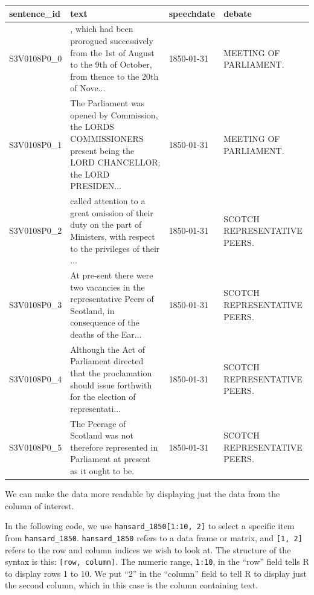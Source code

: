 \documentclass[
]{article}
\begin{document}
\begin{tabular}{l>{\raggedright\arraybackslash}p{4cm}ll}
\toprule
sentence\_id & text & speechdate & debate\\
\midrule
S3V0108P0\_0 & , which had been prorogued successively from the 1st of August to the 9th of October, from thence to the 20th of Nove... & 1850-01-31 & MEETING OF PARLIAMENT.\\
S3V0108P0\_1 & The Parliament was opened by Commission, the LORDS COMMISSIONERS present being the LORD CHANCELLOR; the LORD PRESIDEN... & 1850-01-31 & MEETING OF PARLIAMENT.\\
S3V0108P0\_2 & called attention to a great omission of their duty on the part of Ministers, with respect to the privileges of their ... & 1850-01-31 & SCOTCH REPRESENTATIVE PEERS.\\
S3V0108P0\_3 & At pre-sent there were two vacancies in the representative Peers of Scotland, in consequence of the deaths of the Ear... & 1850-01-31 & SCOTCH REPRESENTATIVE PEERS.\\
S3V0108P0\_4 & Although the Act of Parliament directed that the proclamation should issue forthwith for the election of representati... & 1850-01-31 & SCOTCH REPRESENTATIVE PEERS.\\
\addlinespace
S3V0108P0\_5 & The Peerage of Scotland was not therefore represented in Parliament at present as it ought to be. & 1850-01-31 & SCOTCH REPRESENTATIVE PEERS.\\
\bottomrule
\end{tabular}

We can make the data more readable by displaying just the data from the
column of interest.

In the following code, we use \texttt{hansard\_1850{[}1:10,\ 2{]}} to
select a specific item from \texttt{hansard\_1850}.
\texttt{hansard\_1850} refers to a data frame or matrix, and
\texttt{{[}1,\ 2{]}} refers to the row and column indices we wish to
look at. The structure of the syntax is this:
\texttt{{[}row,\ column{]}}. The numeric range, \texttt{1:10}, in the
``row'' field tells R to display rows 1 to 10. We put ``2'' in the
``column'' field to tell R to display just the second column, which in
this case is the column containing text.
\end{document}
